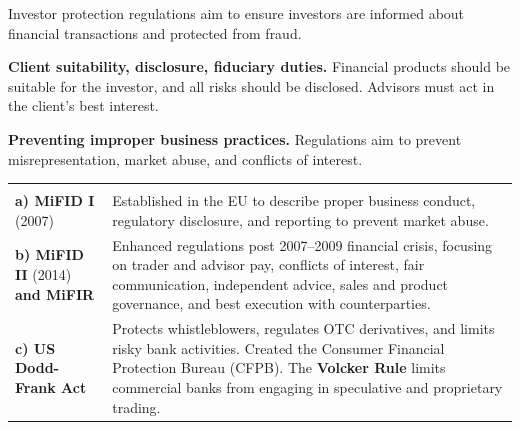 

Investor protection regulations aim to ensure investors are informed about
financial transactions and protected from fraud.


\begin{lettered}
\item \textbf{Client suitability, disclosure, fiduciary duties.} Financial
products should be suitable for the investor, and all risks should be disclosed.
Advisors must act in the client's best interest.
\item \textbf{Preventing improper business practices.} Regulations aim to prevent
misrepresentation, market abuse, and conflicts of interest.
\end{lettered}


\noindent\begin{minipage}{\textwidth}
\renewcommand{\arraystretch}{1.32}
\begin{tabularx}{\textwidth}{@{}L{0.26\textwidth}Y@{}}
  & \\
{\tabfont \textbf{a) MiFID I} (2007)} &
{\tabfont Established in the EU to describe proper business conduct, regulatory
disclosure, and reporting to prevent market abuse.}\\
{\tabfont \textbf{b) MiFID II} (2014) \textbf{and MiFIR}} &
{\tabfont Enhanced regulations post 2007--2009 financial crisis, focusing on
trader and advisor pay, conflicts of interest, fair communication, independent
advice, sales and product governance, and best execution with counterparties.}\\
{\tabfont \textbf{c) US Dodd-Frank Act}} &
{\tabfont Protects whistleblowers, regulates OTC derivatives, and limits risky
bank activities. Created the Consumer Financial Protection Bureau (CFPB). The
\textbf{Volcker Rule} limits commercial banks from engaging in speculative and
proprietary trading.}\\
\end{tabularx}
\end{minipage}

